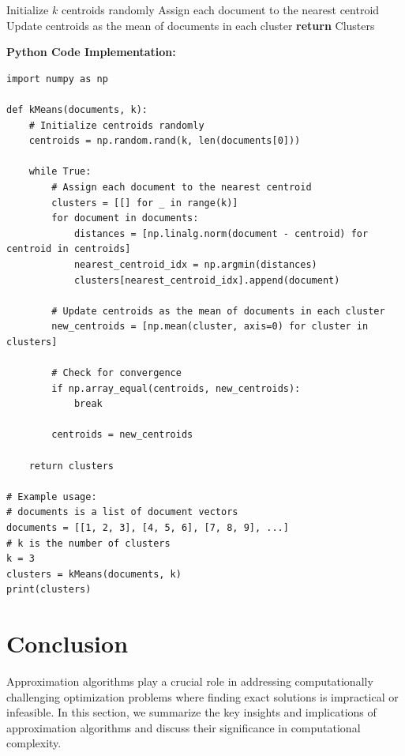 \documentclass[12pt]{book} %
\begin{document}
\begin{algorithm}
\caption{k-means Algorithm}
\begin{algorithmic}[1]
\State Initialize \(k\) centroids randomly
\Repeat
    \State Assign each document to the nearest centroid
    \State Update centroids as the mean of documents in each cluster
\State \textbf{return} Clusters
\EndProcedure
\end{algorithmic}
\end{algorithm}

\FloatBarrier
\textbf{Python Code Implementation:}
\FloatBarrier
\begin{lstlisting}
import numpy as np

def kMeans(documents, k):
    # Initialize centroids randomly
    centroids = np.random.rand(k, len(documents[0]))

    while True:
        # Assign each document to the nearest centroid
        clusters = [[] for _ in range(k)]
        for document in documents:
            distances = [np.linalg.norm(document - centroid) for centroid in centroids]
            nearest_centroid_idx = np.argmin(distances)
            clusters[nearest_centroid_idx].append(document)

        # Update centroids as the mean of documents in each cluster
        new_centroids = [np.mean(cluster, axis=0) for cluster in clusters]

        # Check for convergence
        if np.array_equal(centroids, new_centroids):
            break

        centroids = new_centroids

    return clusters

# Example usage:
# documents is a list of document vectors
documents = [[1, 2, 3], [4, 5, 6], [7, 8, 9], ...]
# k is the number of clusters
k = 3
clusters = kMeans(documents, k)
print(clusters)
\end{lstlisting}

\section{Conclusion}

Approximation algorithms play a crucial role in addressing computationally challenging optimization problems where finding exact solutions is impractical or infeasible. In this section, we summarize the key insights and implications of approximation algorithms and discuss their significance in computational complexity.
\end{document}
